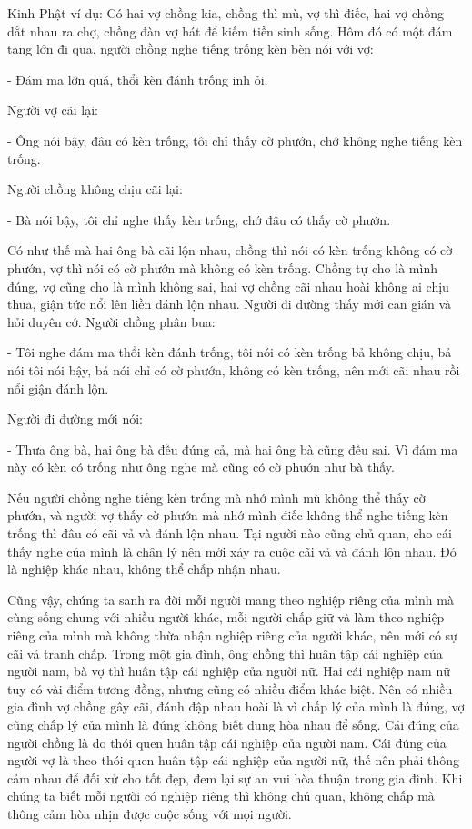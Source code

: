 \documentclass[
  12pt,
  oneside]{book}
\begin{document}
Kinh Phật ví dụ: Có hai vợ chồng kia, chồng thì mù, vợ thì điếc, hai vợ chồng dắt nhau ra chợ, chồng đàn vợ hát để kiếm tiền sinh sống. Hôm đó có một đám tang lớn đi qua, người chồng nghe tiếng trống kèn bèn nói với vợ:

- Đám ma lớn quá, thổi kèn đánh trống inh ỏi.

Người vợ cãi lại:

- Ông nói bậy, đâu có kèn trống, tôi chỉ thấy cờ phướn, chớ không nghe tiếng kèn trống.

Người chồng không chịu cãi lại:

- Bà nói bậy, tôi chỉ nghe thấy kèn trống, chớ đâu có thấy cờ phướn.

Có như thế mà hai ông bà cãi lộn nhau, chồng thì nói có kèn trống không có cờ phướn, vợ thì nói có cờ phướn mà không có kèn trống. Chồng tự cho là mình đúng, vợ cũng cho là mình không sai, hai vợ chồng cãi nhau hoài không ai chịu thua, giận tức nổi lên liền đánh lộn nhau. Người đi đường thấy mới can gián và hỏi duyên cớ. Người chồng phân bua:

- Tôi nghe đám ma thổi kèn đánh trống, tôi nói có kèn trống bả không chịu, bả nói tôi nói bậy, bả nói chỉ có cờ phướn, không có kèn trống, nên mới cãi nhau rồi nổi giận đánh lộn.

Người đi đường mới nói:

- Thưa ông bà, hai ông bà đều đúng cả, mà hai ông bà cũng đều sai. Vì đám ma này có kèn có trống như ông nghe mà cũng có cờ phướn như bà thấy.

Nếu người chồng nghe tiếng kèn trống mà nhớ mình mù không thể thấy cờ phướn, và người vợ thấy cờ phướn mà nhớ mình điếc không thể nghe tiếng kèn trống thì đâu có cãi vả và đánh lộn nhau. Tại người nào cũng chủ quan, cho cái thấy nghe của mình là chân lý nên mới xảy ra cuộc cãi vả và đánh lộn nhau. Đó là nghiệp khác nhau, không thể chấp nhận nhau.

Cũng vậy, chúng ta sanh ra đời mỗi người mang theo nghiệp riêng của mình mà cùng sống chung với nhiều người khác, mỗi người chấp giữ và làm theo nghiệp riêng của mình mà không thừa nhận nghiệp riêng của người khác, nên mới có sự cãi vả tranh chấp. Trong một gia đình, ông chồng thì huân tập cái nghiệp của người nam, bà vợ thì huân tập cái nghiệp của người nữ. Hai cái nghiệp nam nữ tuy có vài điểm tương đồng, nhưng cũng có nhiều điểm khác biệt. Nên có nhiều gia đình vợ chồng gây cãi, đánh đập nhau hoài là vì chấp lý của mình là đúng, vợ cũng chấp lý của mình là đúng không biết dung hòa nhau để sống. Cái đúng của người chồng là do thói quen huân tập cái nghiệp của người nam. Cái đúng của người vợ là theo thói quen huân tập cái nghiệp của người nữ, thế nên phải thông cảm nhau để đối xử cho tốt đẹp, đem lại sự an vui hòa thuận trong gia đình. Khi chúng ta biết mỗi người có nghiệp riêng thì không chủ quan, không chấp mà thông cảm hòa nhịn được cuộc sống với mọi người.
\end{document}
